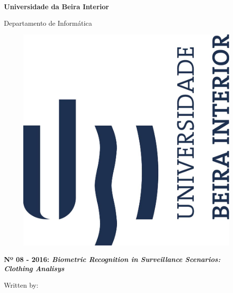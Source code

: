 
\thispagestyle{empty}
\setcounter{page}{-1}

\begin{center}
\begin{Huge}
\textbf{Universidade da Beira Interior}
\end{Huge}
\end{center}

\begin{center}
\begin{Huge}
Departamento de Informática
\end{Huge}
\end{center}

\vspace{0,07cm}
\begin{figure}[!htb]
\centering
\includegraphics[scale=0.3]{brasao.JPG}
\end{figure}

\vspace{0.5cm}
\begin{center}
\begin{Large}
\textbf{Nº 08 - 2016: \emph{Biometric Recognition in Surveillance Scenarios:
Clothing Analisys}}
\end{Large}
\end{center}


\vspace{0.5cm}
\begin{center}
\begin{normalsize}
\begin{large}
Written by:
\end{large}
\end{normalsize}
\end{center}


